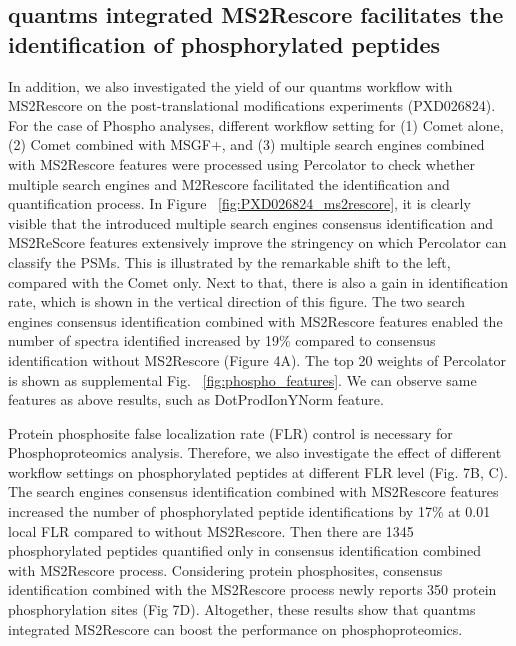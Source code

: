 \documentclass[12pt]{article}
\begin{document}
\subsection{quantms integrated MS2Rescore facilitates the identification of phosphorylated peptides}
In addition, we also investigated the yield of our quantms workflow with MS2Rescore on the post-translational modifications experiments (PXD026824). For the case of Phospho analyses, different workflow setting for (1) Comet alone, (2) Comet combined with MSGF+, and (3) multiple search engines combined with MS2Rescore features were processed using Percolator to check whether multiple search engines and M2Rescore facilitated the identification and quantification process. In Figure ~\ref{fig:PXD026824_ms2rescore}, it is clearly visible that the introduced multiple search engines consensus identification and MS2ReScore features extensively improve the stringency on which Percolator can classify the PSMs. This is illustrated by the remarkable shift to the left, compared with the Comet only. Next to that, there is also a gain in identification rate, which is shown in the vertical direction of this figure. The two search engines consensus identification combined with MS2Rescore features enabled the number of spectra identified increased by 19\% compared to consensus identification without MS2Rescore (Figure 4A). The top 20 weights of Percolator is shown as supplemental Fig.  ~\ref{fig:phospho_features}.  We can observe same features as above results, such as DotProdIonYNorm feature.

Protein phosphosite false localization rate (FLR) control is necessary for Phosphoproteomics analysis. Therefore, we also investigate the effect of different workflow settings on phosphorylated peptides at different FLR level (Fig. 7B, C). The search engines consensus identification combined with MS2Rescore features increased the number of phosphorylated peptide identifications by 17\% at 0.01 local FLR compared to without MS2Rescore. Then there are 1345 phosphorylated peptides quantified only in consensus identification combined with MS2Rescore process. Considering protein phosphosites, consensus identification combined with the MS2Rescore process newly reports 350 protein phosphorylation sites (Fig 7D). Altogether, these results show that quantms integrated MS2Rescore can boost the performance on phosphoproteomics.
\end{document}
